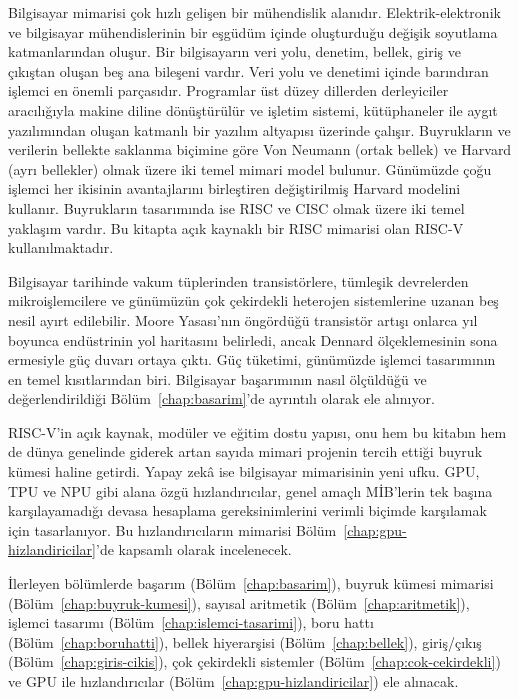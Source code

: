 Bilgisayar mimarisi çok hızlı gelişen bir mühendislik alanıdır. Elektrik-elektronik ve bilgisayar mühendislerinin bir eşgüdüm içinde oluşturduğu değişik soyutlama katmanlarından oluşur. Bir bilgisayarın veri yolu, denetim, bellek, giriş ve çıkıştan oluşan beş ana bileşeni vardır. Veri yolu ve denetimi içinde barındıran işlemci en önemli parçasıdır. Programlar üst düzey dillerden derleyiciler aracılığıyla makine diline dönüştürülür ve işletim sistemi, kütüphaneler ile aygıt yazılımından oluşan katmanlı bir yazılım altyapısı üzerinde çalışır. Buyrukların ve verilerin bellekte saklanma biçimine göre Von Neumann (ortak bellek) ve Harvard (ayrı bellekler) olmak üzere iki temel mimari model bulunur. Günümüzde çoğu işlemci her ikisinin avantajlarını birleştiren değiştirilmiş Harvard modelini kullanır. Buyrukların tasarımında ise RISC ve CISC olmak üzere iki temel yaklaşım vardır. Bu kitapta açık kaynaklı bir RISC mimarisi olan RISC-V kullanılmaktadır.

Bilgisayar tarihinde vakum tüplerinden transistörlere, tümleşik devrelerden mikroişlemcilere ve günümüzün çok çekirdekli heterojen sistemlerine uzanan beş nesil ayırt edilebilir. Moore Yasası'nın öngördüğü transistör artışı onlarca yıl boyunca endüstrinin yol haritasını belirledi, ancak Dennard ölçeklemesinin sona ermesiyle güç duvarı ortaya çıktı. Güç tüketimi, günümüzde işlemci tasarımının en temel kısıtlarından biri. Bilgisayar başarımının nasıl ölçüldüğü ve değerlendirildiği Bölüm~\ref{chap:basarim}'de ayrıntılı olarak ele alınıyor.

RISC-V'in açık kaynak, modüler ve eğitim dostu yapısı, onu hem bu kitabın hem de dünya genelinde giderek artan sayıda mimari projenin tercih ettiği buyruk kümesi haline getirdi. Yapay zekâ ise bilgisayar mimarisinin yeni ufku. GPU, TPU ve NPU gibi alana özgü hızlandırıcılar, genel amaçlı MİB'lerin tek başına karşılayamadığı devasa hesaplama gereksinimlerini verimli biçimde karşılamak için tasarlanıyor. Bu hızlandırıcıların mimarisi Bölüm~\ref{chap:gpu-hizlandiricilar}'de kapsamlı olarak incelenecek.

İlerleyen bölümlerde başarım (Bölüm~\ref{chap:basarim}), buyruk kümesi mimarisi (Bölüm~\ref{chap:buyruk-kumesi}), sayısal aritmetik (Bölüm~\ref{chap:aritmetik}), işlemci tasarımı (Bölüm~\ref{chap:islemci-tasarimi}), boru hattı (Bölüm~\ref{chap:boruhatti}), bellek hiyerarşisi (Bölüm~\ref{chap:bellek}), giriş/çıkış (Bölüm~\ref{chap:giris-cikis}), çok çekirdekli sistemler (Bölüm~\ref{chap:cok-cekirdekli}) ve GPU ile hızlandırıcılar (Bölüm~\ref{chap:gpu-hizlandiricilar}) ele alınacak.



